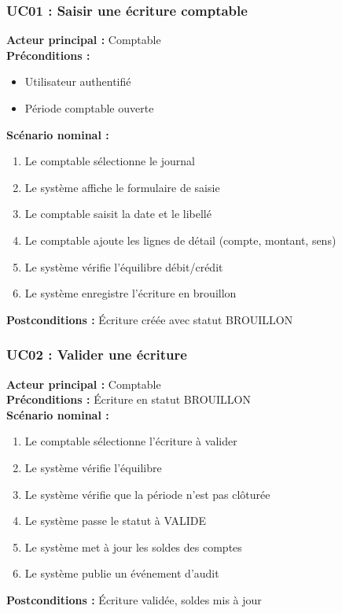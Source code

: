 \documentclass[12pt]{report}
\begin{document}
\subsubsection{UC01 : Saisir une écriture comptable}
\begin{tcolorbox}[colframe=bleuciel, colback=bleuciel!5, boxrule=1pt, arc=4pt]
\textbf{Acteur principal :} Comptable \\
\textbf{Préconditions :} 
\begin{itemize}
    \item Utilisateur authentifié
    \item Période comptable ouverte
\end{itemize}
\textbf{Scénario nominal :}
\begin{enumerate}
    \item Le comptable sélectionne le journal
    \item Le système affiche le formulaire de saisie
    \item Le comptable saisit la date et le libellé
    \item Le comptable ajoute les lignes de détail (compte, montant, sens)
    \item Le système vérifie l'équilibre débit/crédit
    \item Le système enregistre l'écriture en brouillon
\end{enumerate}
\textbf{Postconditions :} Écriture créée avec statut BROUILLON
\end{tcolorbox}

\subsubsection{UC02 : Valider une écriture}
\begin{tcolorbox}[colframe=bleuciel, colback=bleuciel!5, boxrule=1pt, arc=4pt]
\textbf{Acteur principal :} Comptable \\
\textbf{Préconditions :} Écriture en statut BROUILLON \\
\textbf{Scénario nominal :}
\begin{enumerate}
    \item Le comptable sélectionne l'écriture à valider
    \item Le système vérifie l'équilibre
    \item Le système vérifie que la période n'est pas clôturée
    \item Le système passe le statut à VALIDE
    \item Le système met à jour les soldes des comptes
    \item Le système publie un événement d'audit
\end{enumerate}
\textbf{Postconditions :} Écriture validée, soldes mis à jour
\end{tcolorbox}
\end{document}
